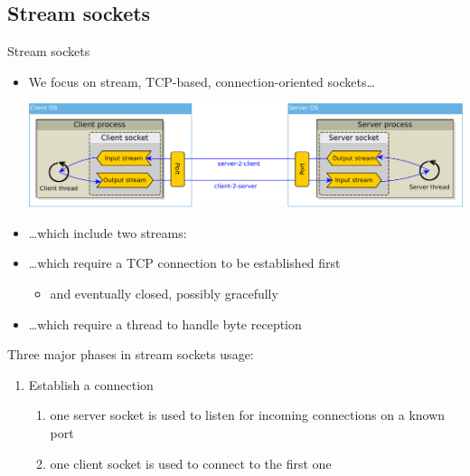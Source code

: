 \documentclass[presentation]{beamer}\mode<presentation>{\usetheme{AMSBolognaFC}}
\begin{document}
\subsection{Stream sockets}

\begin{frame}[c, allowframebreaks]{Stream sockets}

    \begin{itemize}
        \item We focus on \alert{stream}, \alert{TCP}-based, \alert{connection-oriented} sockets\ldots
        \begin{center}
            \includegraphics[width=\linewidth]{figures/sockets.pdf}
        \end{center}

        \smallskip

        \item \ldots which include two \alert{streams}:

        \smallskip

        \item \ldots which require a TCP connection to be \alert{established} first
        \begin{itemize}
            \item and eventually \alert{closed}, possibly gracefully
        \end{itemize}

        \smallskip

        \item \ldots which require a \alert{thread} to handle byte reception
    \end{itemize}

    \framebreak

    Three major phases in stream sockets usage:
    \bigskip
    \begin{enumerate}
        \item Establish a connection
        \begin{enumerate}
            \item one server socket is used to \alert{listen} for incoming connections on a known \alert{port}
            \item one client socket is used to \alert{connect} to the first one
        \end{enumerate}


\end{enumerate}
\end{frame}
\end{document}
